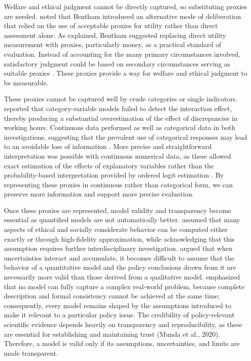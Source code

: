 \documentclass{icsthesis}
\begin{document}
\begin{mainmatter}
Welfare and ethical judgment cannot be directly captured, so substituting proxies are needed. \citet{Baujard2009} noted that Bentham introduced an alternative mode of deliberation that relied on the use of acceptable proxies for utility rather than direct assessment alone. As \citet{Baujard2009} explained, Bentham suggested replacing direct utility measurement with proxies, particularly money, as a practical standard of evaluation. Instead of accounting for the many primary circumstances involved, satisfactory judgment could be based on secondary circumstances serving as suitable proxies \citep{Baujard2009}. These proxies provide a way for welfare and ethical judgment to be measurable.

These proxies cannot be captured well by crude categories or single indicators. \citet{Dunn1993} reported that category-variable models failed to detect the interaction effect, thereby producing a substantial overestimation of the effect of discrepancies in working hours. Continuous data performed as well as categorical data in both investigations, suggesting that the prevalent use of categorical responses may lead to an avoidable loss of information \citep{Dunn1993}. More precise and straightforward interpretation was possible with continuous numerical data, as these allowed exact estimation of the effects of explanatory variables rather than the probability-based interpretation provided by ordered logit estimation \citep{Dunn1993}. By representing these proxies in continuous rather than categorical form, we can preserve more information and support more precise evaluation.

Once these proxies are represented, model validity and transparency become essential as quantified models are not automatically better. \citet{KremerHerman2024b} assumed that many aspects of ethical and socially considerate behavior can be computed either exactly or through high-fidelity approximation, while acknowledging that this assumption requires further interdisciplinary investigation. \citet{Coyle2000} argued that when uncertainties interact and accumulate, it becomes difficult to assume that the behavior of a quantitative model and the policy conclusions drawn from it are necessarily more valid than those derived from a qualitative model. \citet{Munda2020} emphasized that no model can fully capture a complex real-world problem, because complete description and formal consistency cannot be achieved at the same time; consequently, every model remains shaped by the assumptions introduced to make it relevant to a particular policy issue. The credibility of policy-relevant scientific evidence depends heavily on transparency and reproducibility, as these are essential for establishing and maintaining trust (Munda et al., 2020). Therefore, a model is valid only if its assumptions, uncertainties, and limits are made transparent.


\end{mainmatter}
\end{document}
